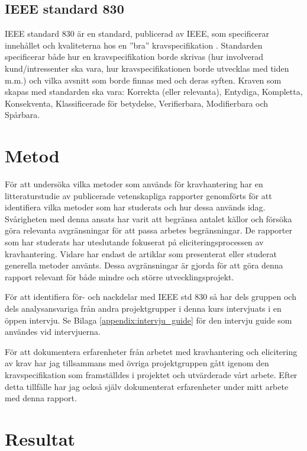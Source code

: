 \subsection{IEEE standard 830}
IEEE standard 830 är en standard, publicerad av IEEE, som specificerar innehållet och kvaliteterna hos en ”bra” kravspecifikation \cite{ieee1998ieee}. Standarden specificerar både hur en kravspecifikation borde skrivas (hur involverad kund/intressenter ska vara, hur kravspecifikationen borde utvecklas med tiden m.m.) och vilka avsnitt som borde finnas med och deras syften. Kraven som skapas med standarden ska vara: Korrekta (eller relevanta), Entydiga, Kompletta, Konsekventa, Klassificerade för betydelse, Verifierbara, Modifierbara och Spårbara.

\section{Metod}
\label{sec:method-jannering}

För att undersöka vilka metoder som används för kravhantering har en litteraturstudie av publicerade vetenskapliga rapporter genomförts för att identifiera vilka metoder som har studerats och hur dessa används idag. Svårigheten med denna ansats har varit att begränsa antalet källor och försöka göra relevanta avgränsningar för att passa arbetes begränsningar. De rapporter som har studerats har uteslutande fokuserat på eliciteringsprocessen av kravhantering. Vidare har endast de artiklar som presenterat eller studerat generella metoder använts. Dessa avgränsningar är gjorda för att göra denna rapport relevant för både mindre och större utvecklingsprojekt.
  
För att identifiera för- och nackdelar med IEEE std 830 \cite{ieee1998ieee} så har dels gruppen och dels analysansvariga från andra projektgrupper i denna kurs intervjuats i en öppen intervju. Se Bilaga \ref{appendix:intervju_guide} för den intervju guide som användes vid intervjuerna.

För att dokumentera erfarenheter från arbetet med kravhantering och elicitering av krav har jag tillsammans med övriga projektgruppen gått igenom den kravspecifikation som framställdes i projektet och utvärderade vårt arbete. Efter detta tillfälle har jag också själv dokumenterat erfarenheter under mitt arbete med denna rapport.




\section{Resultat}
\label{sec:results-jannering}
